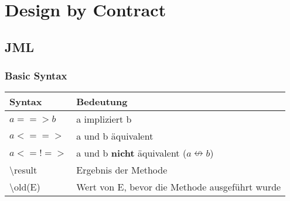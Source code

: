 \chapter{Design by Contract}
\section{JML}
\subsection{Basic Syntax}
\begin{table}[h]
	\centering
	\label{my-label}
	\begin{tabular}{l|l}
		Syntax    & Bedeutung      															\\ \hline
		$a ==> b$ & a impliziert b 															\\ \hline
		$a <==>$  & a und b äquivalent            											\\ \hline
		$a <=!=>$  & a und b \textbf{nicht} äquivalent ($a \nleftrightarrow b$)            	\\ \hline
		\textbackslash result  & Ergebnis der Methode            							\\ \hline
		\textbackslash old(E)  & Wert von E, bevor die Methode ausgeführt wurde        		\\ \hline		
	\end{tabular}
\end{table}

